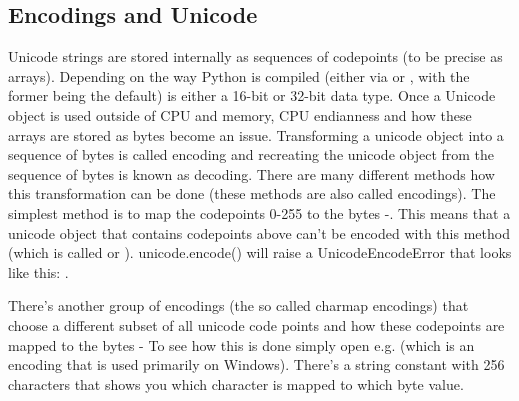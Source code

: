 \subsection{Encodings and Unicode\label{encodings-overview}}

Unicode strings are stored internally as sequences of codepoints (to
be precise as  arrays). Depending on the way Python is
compiled (either via  or 
, with the former being the default)
 is either a 16-bit or
32-bit data type. Once a Unicode object is used outside of CPU and
memory, CPU endianness and how these arrays are stored as bytes become
an issue. Transforming a unicode object into a sequence of bytes is
called encoding and recreating the unicode object from the sequence of
bytes is known as decoding. There are many different methods how this
transformation can be done (these methods are also called encodings).
The simplest method is to map the codepoints 0-255 to the bytes
-. This means that a unicode object that contains 
codepoints above  can't be encoded with this method (which 
is called  or ). unicode.encode() will 
raise a UnicodeEncodeError that looks like this: .

There's another group of encodings (the so called charmap encodings)
that choose a different subset of all unicode code points and how
these codepoints are mapped to the bytes -
To see how this is done simply open e.g. 
(which is an encoding that is used primarily on Windows).
There's a string constant with 256 characters that shows you which 
character is mapped to which byte value.

